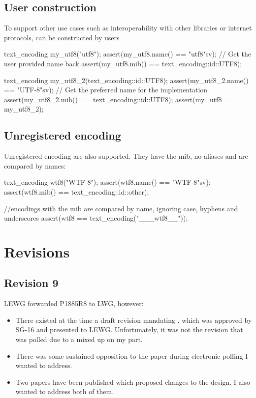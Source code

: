 \documentclass{wg21}
\begin{document}
\subsection{User construction}

To support other use cases such as interoperability with other libraries or internet protocols,
 can be constructed by users

\begin{colorblock}
text_encoding my_utf8("utf8");
assert(my_utf8.name() == "utf8"sv); // Get the user provided name back
assert(my_utf8.mib() == text_encoding::id::UTF8);

text_encoding my_utf8_2(text_encoding::id::UTF8);
assert(my_utf8_2.name() == "UTF-8"sv); // Get the preferred name for the implementation
assert(my_utf8_2.mib() == text_encoding::id::UTF8);
assert(my_utf8 == my_utf8_2);
\end{colorblock}

\subsection{Unregistered encoding}

Unregistered encoding are also supported. They have the  mib, no aliases and are compared
by names:

\begin{colorblock}
text_encoding wtf8("WTF-8");
assert(wtf8.name() == "WTF-8"sv);
assert(wtf8.mib() == text_encoding::id::other);

//encodings with the  mib are compared by name, ignoring case, hyphens and underscores
assert(wtf8 == text_encoding("___wtf8__"));
\end{colorblock}


\section{Revisions}

\subsection*{Revision 9}

LEWG forwarded P1885R8 to LWG, however:
\begin{itemize}
    \item There existed at the time a draft revision mandating , which was approved by SG-16 and presented to LEWG. Unfortunately, it was not the revision that was polled due to a mixed up on my part.
    \item There was some sustained opposition to the paper during electronic polling I wanted to address.
    \item Two papers have been published which proposed changes to the design. I also wanted to address both of them.
\end{itemize}
\end{document}
